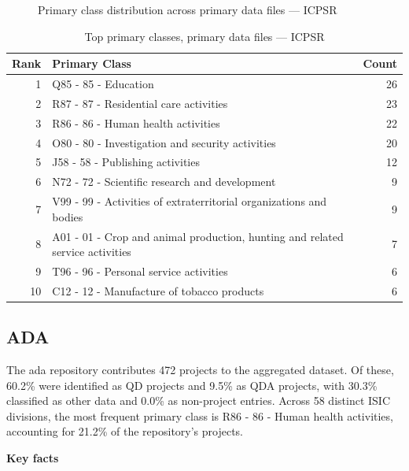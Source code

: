 \clearpage

\begin{figure}[H]
    \centering
    
    \caption{Primary class distribution across primary data files --- ICPSR}
\end{figure}

\begin{table}[H]
    \centering
    \begin{tabular}{r p{10cm} r}
    \hline
    \textbf{Rank} & \textbf{Primary Class} & \textbf{Count} \\
    \hline
    1 & Q85 - 85 - Education & 26 \\
    2 & R87 - 87 - Residential care activities & 23 \\
    3 & R86 - 86 - Human health activities & 22 \\
    4 & O80 - 80 - Investigation and security activities & 20 \\
    5 & J58 - 58 - Publishing activities & 12 \\
    6 & N72 - 72 - Scientific research and development & 9 \\
    7 & V99 - 99 - Activities of extraterritorial organizations and bodies & 9 \\
    8 & A01 - 01 - Crop and animal production, hunting and related service activities & 7 \\
    9 & T96 - 96 - Personal service activities & 6 \\
    10 & C12 - 12 - Manufacture of tobacco products & 6 \\
    \hline
    \end{tabular}
    \caption{Top primary classes, primary data files --- ICPSR}
\end{table}

\clearpage

\subsection{ADA}


The ada repository contributes 472 projects to the aggregated dataset. Of these, 60.2\% were identified as QD projects and 9.5\% as QDA projects, with 30.3\% classified as other data and 0.0\% as non-project entries. Across 58 distinct ISIC divisions, the most frequent primary class is R86 - 86 - Human health activities, accounting for 21.2\% of the repository's projects.


\textbf{Key facts}

